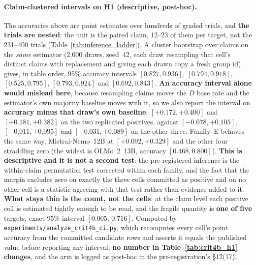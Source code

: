 \paragraph{Claim-clustered intervals on H1 (descriptive, post-hoc).} The accuracies above are point estimates over hundreds of graded trials, and \textbf{the trials are nested}: the unit is the paired claim, 12--23 of them per target, not the 231--400 trials (Table~\ref{tab:inference_ladder}). A cluster bootstrap over claims on the \emph{same} estimator (2{,}000 draws, seed~42, each draw resampling that cell's distinct claims with replacement and giving each drawn copy a fresh group id) gives, in table order, 95\% accuracy intervals $[0.827,0.936]$, $[0.794,0.918]$, $[0.525,0.795]$, $[0.793,0.924]$ and $[0.692,0.843]$. \textbf{An accuracy interval alone would mislead here}, because resampling claims moves the $D$ base rate and the estimator's own majority baseline moves with it, so we also report the interval on \textbf{accuracy minus that draw's own baseline}: $[+0.172,+0.400]$ and $[+0.181,+0.382]$ on the two replicated positives, against $[-0.078,+0.105]$, $[-0.011,+0.095]$ and $[-0.031,+0.089]$ on the other three. Family~E behaves the same way, Mistral-Nemo~12B at $[+0.092,+0.329]$ and the other four straddling zero (the widest is OLMo~2~13B, accuracy $[0.468,0.800]$). \textbf{This is descriptive and it is not a second test}: the pre-registered inference is the within-claim permutation test corrected within each family, and the fact that the margin excludes zero on exactly the three cells committed as positive and on no other cell is a statistic agreeing with that test rather than evidence added to it. \textbf{What stays thin is the count, not the cells}: at the claim level each positive cell is estimated tightly enough to be read, and the fragile quantity is \textbf{one of five} targets, exact 95\% interval $[0.005,\,0.716]$. Computed by \texttt{experiments/analyze\_crit4b\_ci.py}, which recomputes every cell's point accuracy from the committed candidate rows and asserts it equals the published value before reporting any interval; \textbf{no number in Table~\ref{tab:crit4b_h1} changes}, and the arm is logged as post-hoc in the pre-registration's §12(17).

